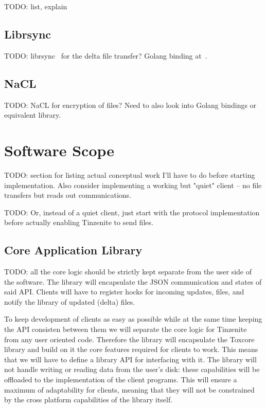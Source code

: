 TODO: list, explain

\subsection{Librsync}

TODO: librsync~\cite{web:site:librsync} for the delta file transfer?
Golang binding at~\cite{web:site:librsync:golang}.

\subsection{NaCL}

TODO: NaCL for encryption of files?
Need to also look into Golang bindings or equivalent library.

\section{Software Scope}
\label{sec:Software Scope}

TODO: section for listing actual conceptual work I'll have to do before starting implementation.
Also consider implementing a working but "quiet" client – no file transfers but reads out communications.

TODO: Or, instead of a quiet client, just start with the protocol implementation before actually enabling Tinzenite to send files.

\subsection{Core Application Library}

TODO: all the core logic should be strictly kept separate from the user side of the software.
The library will encapsulate the JSON communication and states of said API.
Clients will have to register hocks for incoming updates, files, and notify the library of updated (delta) files.

To keep development of clients as easy as possible while at the same time keeping the API consisten between them we will separate the core logic for Tinzenite from any user oriented code.
Therefore the library will encapsulate the Toxcore library and build on it the core features required for clients to work.
This means that we will have to define a library API for interfacing with it.
The library will not handle writing or reading data from the user's disk: these capabilities will be offloaded to the implementation of the client programs.
This will ensure a maximum of adaptability for clients, meaning that they will not be constrained by the cross platform capabilities of the library itself.

